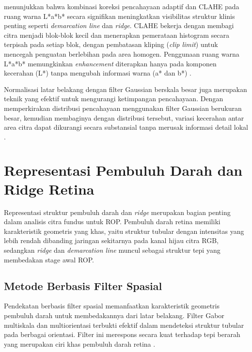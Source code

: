 \citet{Rahim2024} menunjukkan bahwa kombinasi koreksi pencahayaan adaptif dan CLAHE pada ruang
warna L*a*b* secara signifikan meningkatkan visibilitas struktur klinis penting seperti
\textit{demarcation line} dan \textit{ridge}. CLAHE bekerja dengan membagi citra menjadi
blok-blok kecil dan menerapkan pemerataan histogram secara terpisah pada setiap blok, dengan
pembatasan kliping (\textit{clip limit}) untuk mencegah penguatan berlebihan pada area homogen.
Penggunaan ruang warna L*a*b* memungkinkan \textit{enhancement} diterapkan hanya pada komponen
kecerahan (L*) tanpa mengubah informasi warna (a* dan b*) \citep{Rahim2024}.

Normalisasi latar belakang dengan filter Gaussian berskala besar juga merupakan teknik yang
efektif untuk mengurangi ketimpangan pencahayaan. Dengan memperkirakan distribusi pencahayaan
menggunakan filter Gaussian berukuran besar, kemudian membaginya dengan distribusi tersebut,
variasi kecerahan antar area citra dapat dikurangi secara substansial tanpa merusak informasi
detail lokal \citep{Almeida2024}.

\section{Representasi Pembuluh Darah dan Ridge Retina}

Representasi struktur pembuluh darah dan \textit{ridge} merupakan bagian penting dalam
analisis citra fundus untuk ROP. Pembuluh darah retina memiliki karakteristik geometris
yang khas, yaitu struktur tubular dengan intensitas yang lebih rendah dibanding jaringan
sekitarnya pada kanal hijau citra RGB, sedangkan \textit{ridge} dan \textit{demarcation line}
muncul sebagai struktur tepi yang membedakan stage awal ROP.

\subsection{Metode Berbasis Filter Spasial}

Pendekatan berbasis filter spasial memanfaatkan karakteristik geometris pembuluh darah untuk
membedakannya dari latar belakang. Filter Gabor multiskala dan multiorientasi terbukti efektif
dalam mendeteksi struktur tubular pada berbagai orientasi. Filter ini merespons secara kuat
terhadap tepi berarah yang merupakan ciri khas pembuluh darah retina \citep{Khandouzi2022}.

